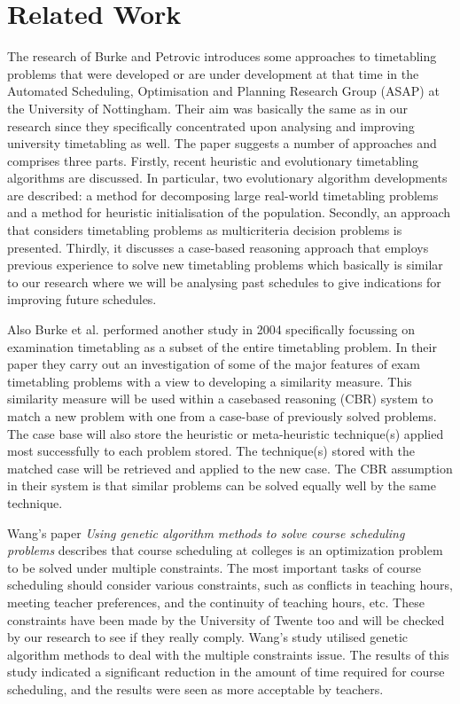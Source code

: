 \section{Related Work}
The research of Burke and Petrovic \cite{recentResearchDirectionsInAutomatedTimetabling} introduces some approaches to timetabling problems that were developed or are under development at that time in the Automated Scheduling, Optimisation and Planning Research Group (ASAP) at the University of Nottingham. Their aim was basically the same as in our research since they specifically concentrated upon analysing and improving university timetabling as well. The paper suggests a number of approaches and comprises three parts. Firstly, recent heuristic and evolutionary timetabling algorithms are discussed. In particular, two evolutionary algorithm developments are described: a method for decomposing large real-world timetabling problems and a method for heuristic initialisation of the population. Secondly, an approach that considers timetabling problems as multicriteria decision problems is presented. Thirdly, it discusses a case-based reasoning approach that employs previous experience to solve new timetabling problems which basically is similar to our research where we will be analysing past schedules to give indications for improving future schedules.

Also Burke et al. performed another study in 2004 \cite{burke2004analysing} specifically focussing on examination timetabling as a subset of the entire timetabling problem. In their paper they carry out an investigation of some of the major features of exam timetabling problems with a view to developing
a similarity measure. This similarity measure will be used within a casebased reasoning (CBR) system to match a new problem with one from a case-base of previously solved problems. The case base will also store the heuristic or meta-heuristic technique(s) applied most successfully to each problem stored. The technique(s) stored with the matched case will be retrieved and applied to the new case. The CBR assumption in their system is that similar problems can be solved equally well by the same technique.

Wang's paper \textit{Using genetic algorithm methods to solve course scheduling problems} \cite{usingGeneticAlgorithmMethodsToSolveScheduling} describes that course scheduling at colleges is an optimization problem to be solved under multiple constraints. The most important tasks of course scheduling should consider various constraints, such as conflicts in teaching hours, meeting teacher preferences, and the continuity of teaching hours, etc. These constraints have been made by the University of Twente too and will be checked by our research to see if they really comply. Wang's study utilised genetic algorithm methods to deal with the multiple constraints issue. The results of this study indicated a significant reduction in the amount of time required for course scheduling, and the results were seen as more acceptable by teachers.

